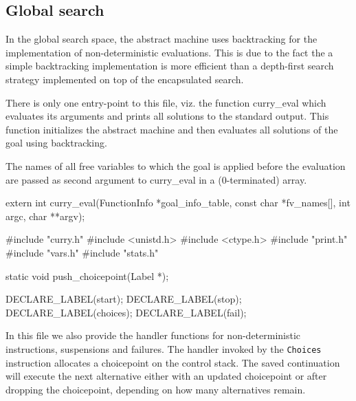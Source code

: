 %
%
\subsection{Global search}
In the global search space, the abstract machine uses backtracking for
the implementation of non-deterministic evaluations. This is due to
the fact the a simple backtracking implementation is more efficient
than a depth-first search strategy implemented on top of the
encapsulated search.

There is only one entry-point to this file, viz. the function
{\Tt{}curry{\_}eval\nwendquote} which evaluates its arguments and prints all solutions
to the standard output. This function initializes the abstract machine
and then evaluates all solutions of the goal using backtracking.

The names of all free variables to which the goal is applied before
the evaluation are passed as second argument to {\Tt{}curry{\_}eval\nwendquote} in a
(0-terminated) array.

\nwenddocs{}\endmoddef\nwstartdeflinemarkup\nwenddeflinemarkup
extern int curry_eval(FunctionInfo *goal_info_table, const char *fv_names[],
                      int argc, char **argv);

\nwendcode{}\nwdocspar
\nwenddocs{}\endmoddef\nwstartdeflinemarkup{}\nwenddeflinemarkup
#include "curry.h"
#include <unistd.h>
#include <ctype.h>
#include "print.h"
#include "vars.h"
#include "stats.h"

static void push_choicepoint(Label *);

DECLARE_LABEL(start);
DECLARE_LABEL(stop);
DECLARE_LABEL(choices);
DECLARE_LABEL(fail);

\nwendcode{}\nwdocspar
In this file we also provide the handler functions for
non-deterministic instructions, suspensions and failures. The handler
invoked by the \texttt{Choices} instruction allocates a choicepoint on
the control stack. The saved continuation will execute the next
alternative either with an updated choicepoint or after dropping the
choicepoint, depending on how many alternatives remain.


